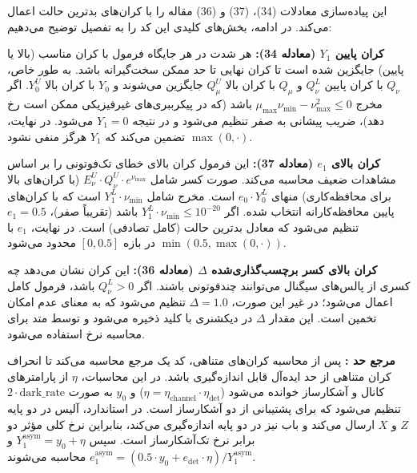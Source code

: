 این پیاده‌سازی معادلات (34)، (37) و (36) مقاله را با کران‌های بدترین حالت اعمال می‌کند. در ادامه، بخش‌های کلیدی این کد را به تفصیل توضیح می‌دهیم:

\textbf{کران پایین $Y_1$ (معادله 34):} هر شدت در هر جایگاه فرمول با کران مناسب (بالا یا پایین) جایگزین شده است تا کران نهایی تا حد ممکن سخت‌گیرانه باشد. به طور خاص، $Q_\nu$ با کران پایین $Q_\nu^L$ و $Q_\mu$ با کران بالا $Q_\mu^U$ جایگزین می‌شوند و $Y_0$ با کران بالا $Y_0^U$. اگر مخرج $\mu_{\max} \nu_{\min} - \nu_{\max}^2 \le 0$ باشد (که در پیکرببری‌های غیرفیزیکی ممکن است رخ دهد)، ضریب پیشانی به صفر تنظیم می‌شود و در نتیجه $Y_1 = 0$ می‌شود. در نهایت، $\max(0, \cdot)$ تضمین می‌کند که $Y_1$ هرگز منفی نشود.

\textbf{کران بالای $e_1$ (معادله 37):} این فرمول کران بالای خطای تک‌فوتونی را بر اساس مشاهدات  ضعیف محاسبه می‌کند. صورت کسر شامل $E_\nu^U \cdot Q_\nu^U \cdot e^{\nu_{\max}}$ (با کران‌های بالا برای محافظه‌کاری) منهای $e_0 \cdot Y_0^L$ است. مخرج شامل $Y_1^L \cdot \nu_{\min}$ است که با کران‌های پایین محافظه‌کارانه انتخاب شده. اگر $Y_1^L \cdot \nu_{\min} \le 10^{-20}$ باشد (تقریباً صفر)، $e_1 = 0.5$ تنظیم می‌شود که معادل بدترین حالت (کامل تصادفی) است. در نهایت، $e_1$ با $\min(0.5, \max(0, \cdot))$ در بازه $[0, 0.5]$ محدود می‌شود.

\textbf{کران بالای کسر برچسب‌گذاری‌شده $\Delta$ (معادله 36):} این کران نشان می‌دهد چه کسری از پالس‌های سیگنال می‌توانند چندفوتونی باشند. اگر $Q_\nu^L > 0$ باشد، فرمول کامل اعمال می‌شود؛ در غیر این صورت، $\Delta = 1.0$ تنظیم می‌شود که به معنای عدم امکان تخمین است. این مقدار $\Delta$ در دیکشنری  با کلید  ذخیره می‌شود و توسط متد  برای محاسبه نرخ  استفاده می‌شود.

\textbf{مرجع حد :} پس از محاسبه کران‌های متناهی، کد یک مرجع  محاسبه می‌کند تا انحراف کران متناهی از حد ایده‌آل قابل اندازه‌گیری باشد. در این محاسبات، $\eta$ از پارامترهای کانال و آشکارساز خوانده می‌شود ($\eta = \eta_{\text{channel}} \cdot \eta_{\text{det}}$) و $y_0$ به صورت $2 \cdot \text{dark\_rate}$ تنظیم می‌شود که  برای پشتیبانی از  دو آشکارساز است. در  استاندارد، آلیس در دو پایه $Z$ و $X$ ارسال می‌کند و باب نیز در دو پایه اندازه‌گیری می‌کند، بنابراین نرخ کلی  مؤثر دو برابر نرخ تک‌آشکارساز است. سپس $Y_1^{\text{asym}} = y_0 + \eta$ و $e_1^{\text{asym}} = (0.5 \cdot y_0 + e_{\text{det}} \cdot \eta) / Y_1^{\text{asym}}$ محاسبه می‌شوند.

